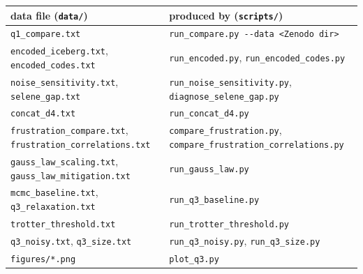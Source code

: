 \documentclass[11pt,a4paper]{article}
\newcommand{\code}[1]{\nolinkurl{#1}}
\begin{document}
\begin{center}\small
\begin{tabularx}{\linewidth}{LL}
\toprule
data file (\code{data/}) & produced by (\code{scripts/})\\
\midrule
\code{q1_compare.txt} & \code{run_compare.py --data <Zenodo dir>}\\
\code{encoded_iceberg.txt}, \code{encoded_codes.txt} & \code{run_encoded.py}, \code{run_encoded_codes.py}\\
\code{noise_sensitivity.txt}, \code{selene_gap.txt} & \code{run_noise_sensitivity.py}, \code{diagnose_selene_gap.py}\\
\code{concat_d4.txt} & \code{run_concat_d4.py}\\
\code{frustration_compare.txt}, \code{frustration_correlations.txt} & \code{compare_frustration.py}, \code{compare_frustration_correlations.py}\\
\code{gauss_law_scaling.txt}, \code{gauss_law_mitigation.txt} & \code{run_gauss_law.py}\\
\code{mcmc_baseline.txt}, \code{q3_relaxation.txt} & \code{run_q3_baseline.py}\\
\code{trotter_threshold.txt} & \code{run_trotter_threshold.py}\\
\code{q3_noisy.txt}, \code{q3_size.txt} & \code{run_q3_noisy.py}, \code{run_q3_size.py}\\
\code{figures/*.png} & \code{plot_q3.py}\\
\bottomrule
\end{tabularx}
\end{center}
\end{document}
